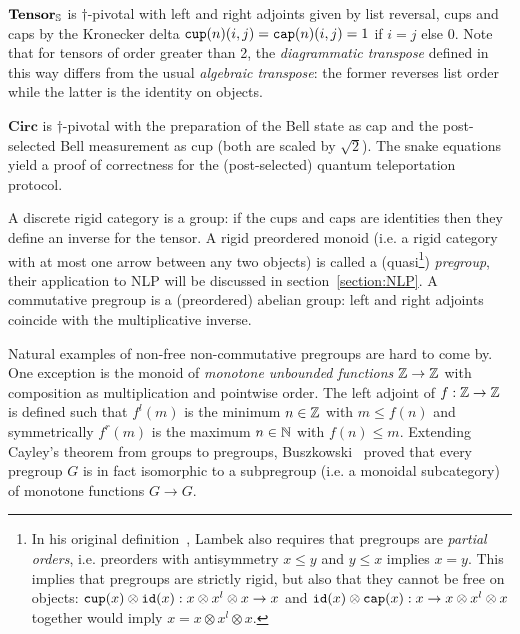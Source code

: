 \begin{example}
$\mathbf{Tensor}_\S$ is $\dagger$-pivotal with left and right adjoints given by list reversal, cups and caps by the Kronecker delta $\ttcup(n)(i, j) = \ttcap(n)(i, j) = 1$ if $i = j$ else $0$.
Note that for tensors of order greater than 2, the \emph{diagrammatic transpose} defined in this way differs from the usual \emph{algebraic transpose}: the former reverses list order while the latter is the identity on objects.
\end{example}

\begin{example}
$\mathbf{Circ}$ is $\dagger$-pivotal with the preparation of the Bell state as cap and the post-selected Bell measurement as cup (both are scaled by $\sqrt{2}$).
The snake equations yield a proof of correctness for the (post-selected) quantum teleportation protocol.
\end{example}

\begin{example}\label{example:pregroups}
A discrete rigid category is a group: if the cups and caps are identities then they define an inverse for the tensor.
A rigid preordered monoid (i.e. a rigid category with at most one arrow between any two objects) is called a (quasi\footnote
{In his original definition~\cite{Lambek99}, Lambek also requires that pregroups are \emph{partial orders}, i.e. preorders with antisymmetry $x \leq y$ and $y \leq x$ implies $x = y$.
This implies that pregroups are strictly rigid, but also that they cannot be free on objects: $\ttcup(x) \otimes \id(x) : x \otimes x^l \otimes x \to x$ and $\id(x) \otimes \ttcap(x) : x \to x \otimes x^l \otimes x$ together would imply $x = x \otimes x^l \otimes x$.
}) \emph{pregroup}, their application to NLP will be discussed in section~\ref{section:NLP}.
A commutative pregroup is a (preordered) abelian group: left and right adjoints coincide with the multiplicative inverse.

Natural examples of non-free non-commutative pregroups are hard to come by.
One exception is the monoid of \emph{monotone unbounded functions} $\Z \to \Z$ with composition as multiplication and pointwise order.
The left adjoint of $f : \Z \to \Z$ is defined such that $f^l(m)$ is the minimum $n \in \Z$ with $m \leq f(n)$ and symmetrically $f^r(m)$ is the maximum $n \in \N$ with $f(n) \leq m$.
Extending Cayley's theorem from groups to pregroups, Buszkowski~\cite[Proposition~2]{Buszkowski01} proved that every pregroup $G$ is in fact isomorphic to a subpregroup (i.e. a monoidal subcategory) of monotone functions $G \to G$.
\end{example}

